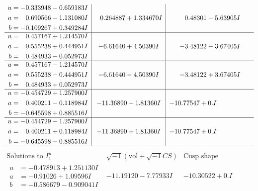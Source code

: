 \documentclass[1p]{elsarticle_modified}
\theoremstyle{definition}
\newcommand{\I}{\sqrt{-1}}
\begin{document}
$$\begin{array}{c|c|c}
\begin{aligned}
u &= -0.333948 - 0.659183 I \\
a &= \phantom{-}0.690566 - 1.131080 I \\
b &= -0.109267 + 0.349284 I\end{aligned}
 & \phantom{-}0.264887 + 1.334670 I & \phantom{-}0.48301 - 5.63905 I \\ \hline\begin{aligned}
u &= \phantom{-}0.457167 + 1.214570 I \\
a &= \phantom{-}0.555238 + 0.444951 I \\
b &= \phantom{-}0.484933 - 0.052973 I\end{aligned}
 & -6.61640 + 4.50390 I & -3.48122 - 3.67405 I \\ \hline\begin{aligned}
u &= \phantom{-}0.457167 - 1.214570 I \\
a &= \phantom{-}0.555238 - 0.444951 I \\
b &= \phantom{-}0.484933 + 0.052973 I\end{aligned}
 & -6.61640 - 4.50390 I & -3.48122 + 3.67405 I \\ \hline\begin{aligned}
u &= -0.454729 + 1.257900 I \\
a &= \phantom{-}0.400211 - 0.118984 I \\
b &= -0.645598 + 0.885516 I\end{aligned}
 & -11.36890 - 1.81360 I & -10.77547 + 0. I\phantom{ +0.000000I} \\ \hline\begin{aligned}
u &= -0.454729 - 1.257900 I \\
a &= \phantom{-}0.400211 + 0.118984 I \\
b &= -0.645598 - 0.885516 I\end{aligned}
 & -11.36890 + 1.81360 I & -10.77547 + 0. I\phantom{ +0.000000I}\\
 \hline 
 \end{array}$$\newpage$$\begin{array}{c|c|c}  
\text{Solutions to }I^u_{1}& \I (\text{vol} + \sqrt{-1}CS) & \text{Cusp shape}\\
 \hline 
\begin{aligned}
u &= -0.478913 + 1.251130 I \\
a &= -0.91026 + 1.09596 I \\
b &= -0.586679 - 0.909041 I\end{aligned}
 & -11.19120 - 7.77933 I & -10.30522 + 0. I\phantom{ +0.000000I} \\ \hline\begin{aligned}

\end{aligned}
\end{array}$$
\end{document}
